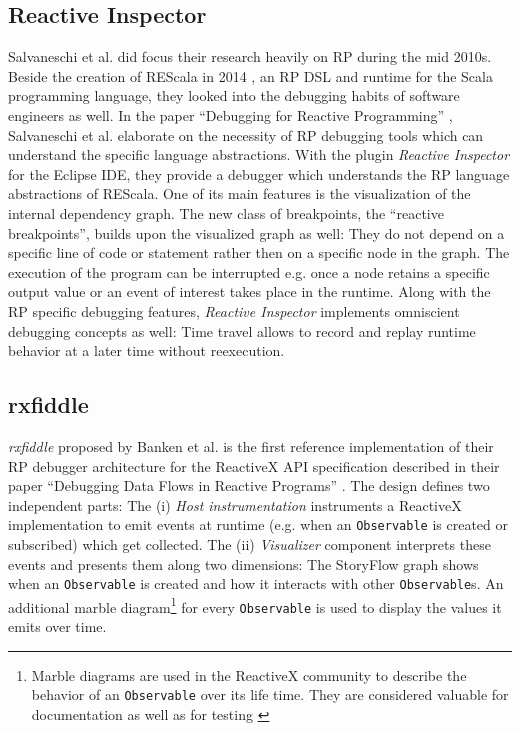 \documentclass[12pt,a4paper]{article}
\begin{document}
\subsection{Reactive Inspector}

Salvaneschi et al. did focus their research heavily on RP during the mid 2010s. Beside the creation of REScala in 2014 \cite{10.1145/2577080.2577083}, an RP DSL and runtime for the Scala programming language, they looked into the debugging habits of software engineers as well. In the paper ``Debugging for Reactive Programming'' \cite{10.1145/2884781.2884815}, Salvaneschi et al. elaborate on the necessity of RP debugging tools which can understand the specific language abstractions. With the plugin \emph{Reactive Inspector} for the Eclipse IDE, they provide a debugger which understands the RP language abstractions of REScala. One of its main features is the visualization of the internal dependency graph. The new class of  breakpoints, the ``reactive breakpoints'', builds upon the visualized graph as well: They do not depend on a specific line of code or statement rather then on a specific node in the graph. The execution of the program can be interrupted e.g. once a node retains a specific output value or an event of interest takes place in the runtime. Along with the RP specific debugging features, \emph{Reactive Inspector} implements omniscient debugging concepts as well: Time travel allows to record and replay runtime behavior at a later time without reexecution.

\subsection{rxfiddle}

\emph{rxfiddle} proposed by Banken et al. is the first reference implementation of their RP debugger architecture for the ReactiveX API specification described in their paper ``Debugging Data Flows in Reactive Programs'' \cite{10.1145/3180155.3180156}. The design defines two independent parts: The (i) \emph{Host instrumentation} instruments a ReactiveX implementation to emit events at runtime (e.g. when an \texttt{Observable} is created or subscribed) which get collected. The (ii) \emph{Visualizer} component interprets these events and presents them along two dimensions: The StoryFlow graph \cite{YWu2013a} shows when an \texttt{Observable} is created and how it interacts with other \texttt{Observable}s. An additional marble diagram\footnote{Marble diagrams are used in the ReactiveX community to describe the behavior of an \texttt{Observable} over its life time. They are considered valuable for documentation \cite{marblediagrams} as well as for testing \cite{marbletesting}} for every \texttt{Observable} is used to display the values it emits over time.
\end{document}
